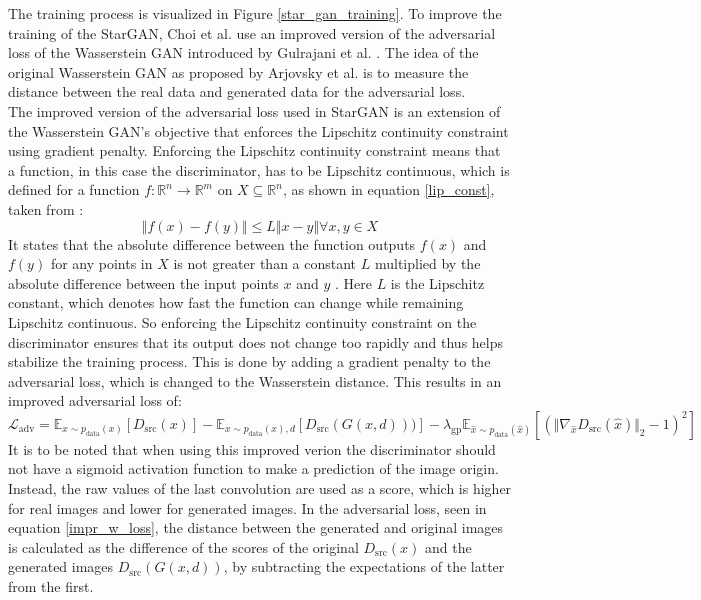 The training process is visualized in Figure \ref{star_gan_training}.
To improve the training of the StarGAN, Choi et al. \cite{choi2018stargan} use an improved version of the adversarial loss of the Wasserstein GAN introduced by Gulrajani et al. \cite{Gulrajani2017}.
The idea of the original Wasserstein GAN as proposed by Arjovsky et al. \cite{Arjovsky2017} is to measure the distance between the real data and generated data for the adversarial loss.\\
The improved version of the adversarial loss used in StarGAN is an extension of the Wasserstein GAN's objective that enforces the Lipschitz continuity constraint using gradient penalty.
Enforcing the Lipschitz continuity constraint means that a function, in this case the discriminator, has to be Lipschitz continuous, which is defined for a function $f: \mathbb{R}^n \rightarrow \mathbb{R}^m$ on $X\subseteq\mathbb{R}^n$, as shown in equation \ref{lip_const}, taken from \cite{Fazlyab2019}:  
\begin{equation}\label{lip_const}
    \Vert f(x) - f(y) \Vert \leq L\Vert x - y \Vert \forall x,y \in X
\end{equation}
It states that the absolute difference between the function outputs $f(x)$ and $f(y)$ for any points in $X$ is not greater than a constant $L$ multiplied by the absolute difference between the input points $x$ and $y$ \cite{Fazlyab2019}.
Here $L$ is the Lipschitz constant, which denotes how fast the function can change while remaining Lipschitz continuous.
So enforcing the Lipschitz continuity constraint on the discriminator ensures that its output does not change too rapidly and thus helps stabilize the training process.
This is done by adding a gradient penalty to the adversarial loss, which is changed to the Wasserstein distance.
This results in an improved adversarial loss of: 
\begin{equation}
    \mathcal{L}_{\text{adv}} = \mathbb{E}_{x\sim p_{\text{data}}(x)}[D_{\text{src}}(x)]-\mathbb{E}_{x\sim p_{\text{data}}(x), d}[D_{\text{src}}(G(x, d)))] - \lambda_{\text{gp}}\mathbb{E}_{\hat{x}\sim p_{\text{data}}(\hat{x})}[(\Vert\nabla_{\hat{x}}D_{\text{src}}(\hat{x})\Vert_2 -1)^2]
    \label{impr_w_loss}
\end{equation} 
It is to be noted that when using this improved verion the discriminator should not have a sigmoid activation function to make a prediction of the image origin.
Instead, the raw values of the last convolution are used as a score, which is higher for real images and lower for generated images.
In the adversarial loss, seen in equation \ref{impr_w_loss}, the distance between the generated and original images is calculated as the difference of the scores of the original $D_{\text{src}}(x)$ and the generated images $D_{\text{src}}(G(x, d))$, by subtracting the expectations of the latter from the first.
